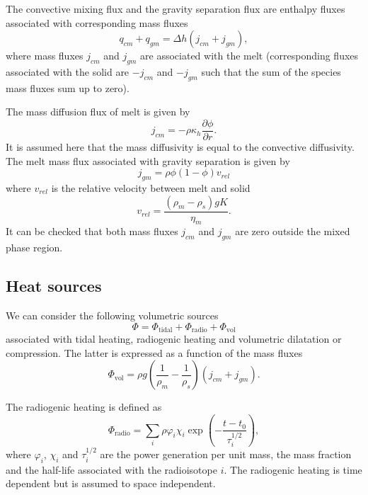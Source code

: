 \documentclass{article}
\begin{document}
The convective mixing flux and the gravity separation flux are enthalpy fluxes associated with corresponding mass fluxes
\begin{equation}
    q_{cm} + q_{gm} = \Delta h \left( j_{cm} + j_{gm} \right),
\end{equation}
where mass fluxes $j_{cm}$ and $j_{gm}$ are associated with the melt (corresponding fluxes associated with the solid are $-j_{cm}$ and $-j_{gm}$ such that the sum of the species mass fluxes sum up to zero).

The mass diffusion flux of melt is given by
\begin{equation}
    j_{cm} = - \rho \kappa_h \frac{\partial \phi}{\partial r}.
    \label{eq.jcm}
\end{equation}
It is assumed here that the mass diffusivity is equal to the convective diffusivity. The melt mass flux associated with gravity separation is given by
\begin{equation}
    j_{gm} = \rho \phi (1-\phi) v_{rel}
\end{equation}
where $v_{rel}$ is the relative velocity between melt and solid
\begin{equation}
    v_{rel} = \frac{(\rho_m-\rho_s)g K}{\eta_m}.
    \label{eq.vrel}
\end{equation}
It can be checked that both mass fluxes $j_{cm}$ and $j_{gm}$ are zero outside the mixed phase region.

\subsection{Heat sources}
We can consider the following volumetric sources
\begin{equation}
    \Phi = \Phi_\mathrm{tidal} + \Phi_\mathrm{radio} + \Phi_\mathrm{vol}
\end{equation}
associated with tidal heating, radiogenic heating and volumetric dilatation or compression. The latter is expressed as a function of the mass fluxes
\begin{equation}
    \Phi_\mathrm{vol} = \rho g\left( \frac{1}{\rho_m}- \frac{1}{\rho_s}\right) \left( j_{cm} + j_{gm}\right).
\end{equation}

The radiogenic heating is defined as
\begin{equation}
    \Phi_\mathrm{radio} = \sum_i \rho
    \varphi_i \chi_i \exp\left(-\frac{t-t_0}{\tau^{1/2}_i} \right),
\end{equation}
where $\varphi_i$, $\chi_i$ and $\tau^{1/2}_i$ are the power generation per unit mass, the mass fraction and the half-life associated with the radioisotope $i$. The radiogenic heating is time dependent but is assumed to space independent.
\end{document}
